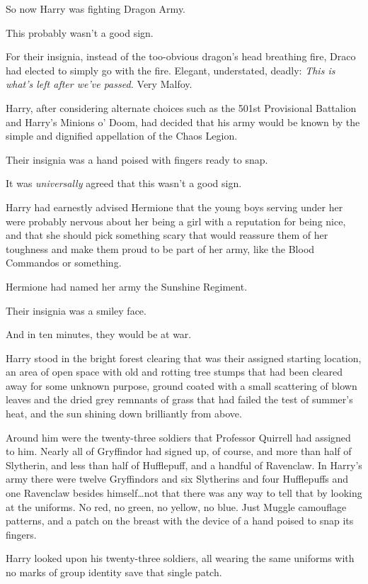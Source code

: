 So now Harry was fighting Dragon Army.

This probably wasn’t a good sign.

For their insignia, instead of the too-obvious dragon’s head breathing fire, Draco had elected to simply go with the fire. Elegant, understated, deadly: \emph{This is what’s left after we’ve passed.} Very Malfoy.

Harry, after considering alternate choices such as the 501st Provisional Battalion and Harry’s Minions o’ Doom, had decided that his army would be known by the simple and dignified appellation of the Chaos Legion.

Their insignia was a hand poised with fingers ready to snap.

It was \emph{universally} agreed that this wasn’t a good sign.

Harry had earnestly advised Hermione that the young boys serving under her were probably nervous about her being a girl with a reputation for being nice, and that she should pick something scary that would reassure them of her toughness and make them proud to be part of her army, like the Blood Commandos or something.

Hermione had named her army the Sunshine Regiment.

Their insignia was a smiley face.

And in ten minutes, they would be at war.

Harry stood in the bright forest clearing that was their assigned starting location, an area of open space with old and rotting tree stumps that had been cleared away for some unknown purpose, ground coated with a small scattering of blown leaves and the dried grey remnants of grass that had failed the test of summer’s heat, and the sun shining down brilliantly from above.

Around him were the twenty-three soldiers that Professor Quirrell had assigned to him. Nearly all of Gryffindor had signed up, of course, and more than half of Slytherin, and less than half of Hufflepuff, and a handful of Ravenclaw. In Harry’s army there were twelve Gryffindors and six Slytherins and four Hufflepuffs and one Ravenclaw besides himself…not that there was any way to tell that by looking at the uniforms. No red, no green, no yellow, no blue. Just Muggle camouflage patterns, and a patch on the breast with the device of a hand poised to snap its fingers.

Harry looked upon his twenty-three soldiers, all wearing the same uniforms with no marks of group identity save that single patch.

